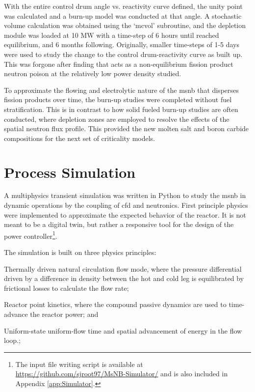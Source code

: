  With the entire control drum angle vs. reactivity curve defined, the unity point was calculated and a burn-up model was conducted at that angle. A stochastic volume calculation was obtained using the `mcvol' subroutine, and the depletion module was loaded at 10 MW with a time-step of 6 hours until \Xe reached equilibrium, and 6 months following. Originally, smaller time-steps of 1-5 days were used to study the change to the control drum-reactivity curve as \Sm built up. This was forgone after finding that \Sm acts as a non-equilibrium fission product neutron poison at the relatively low power density studied. 
 
 To approximate the flowing and electrolytic nature of the \acs{msnb} that disperses fission products over time, the burn-up studies were completed without fuel stratification. This is in contrast to how solid fueled burn-up studies are often conducted, where depletion zones are employed to resolve the effects of the spatial neutron flux profile. This provided the new molten salt and boron carbide compositions for the next set of criticality models.

\section{Process Simulation}\label{Section:Python}
A multiphysics transient simulation was written in Python to study the \acs{msnb} in dynamic operations by the coupling of \acf{cfd} and neutronics. First principle physics were implemented to approximate the expected behavior of the reactor. It is not meant to be a digital twin, but rather a responsive tool for the design of the power controller\footnote{The input file writing script is available at \href{https://github.com/sjroot97/MsNB-Simulator/}{https://github.com/sjroot97/MsNB-Simulator/} and is also included in Appendix \ref{app:Simulator}.}.

The simulation is built on three physics principles: 
\begin{enumerate*}
    \item Thermally driven natural circulation flow mode, where the pressure differential driven by a difference in density between the hot and cold leg is equilibrated by frictional losses to calculate the flow rate;
    \item Reactor point kinetics, where the compound passive dynamics are used to time-advance the reactor power; and
    \item Uniform-state uniform-flow time and spatial advancement of energy in the flow loop.;
\end{enumerate*}

